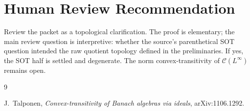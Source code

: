 \documentclass[11pt]{article}
\newcommand{\Calk}{\mathcal C}
\begin{document}
\section*{Human Review Recommendation}

Review the packet as a topological clarification. The proof is elementary; the
main review question is interpretive: whether the source's parenthetical SOT
question intended the raw quotient topology defined in the preliminaries. If
yes, the SOT half is settled and degenerate. The norm convex-transitivity of
\(\Calk(L^\infty)\) remains open.

\begin{thebibliography}{9}

J.~Talponen,
\emph{Convex-transitivity of Banach algebras via ideals},
arXiv:1106.1292.

\end{thebibliography}
\end{document}
